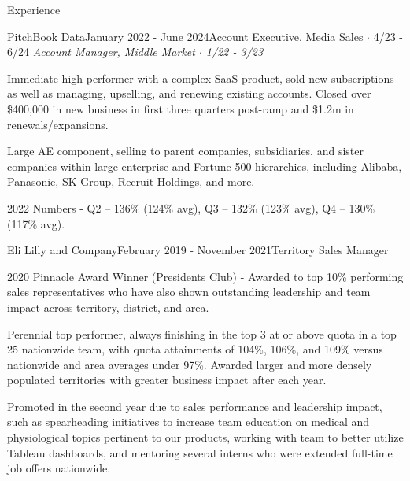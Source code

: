 \documentclass[
	11pt, %
]{resume} %
\begin{document}
\begin{rSection}{Experience}
\begin{rSubsection}{PitchBook Data}{January 2022 - June 2024\smallskip}{Account Executive, Media Sales $\cdot$ 4/23 - 6/24}{}
        \smallskip
        \smallskip
            \textit{Account Manager, Middle Market $\cdot$ 1/22 - 3/23}
        \smallskip
        \smallskip
		\item Immediate high performer with a complex SaaS product, sold new subscriptions as well as managing, upselling, and renewing existing accounts. Closed over \$400,000 in new business in first three quarters post-ramp and \$1.2m in renewals/expansions.
            \item Large AE component, selling to parent companies, subsidiaries, and sister companies within large enterprise and Fortune 500 hierarchies, including Alibaba, Panasonic, SK Group, Recruit Holdings, and more.
		\item 2022 Numbers - Q2 – 136\% (124\% avg), Q3 – 132\% (123\% avg), Q4 – 130\% (117\% avg).
            
	\end{rSubsection}


	\begin{rSubsection}{Eli Lilly and Company}{February 2019 - November 2021}{Territory Sales Manager}{}
		\item 2020 Pinnacle Award Winner (Presidents Club) - Awarded to top 10\% performing sales representatives who have also shown outstanding leadership and team impact across territory, district, and area.
		\item Perennial top performer, always finishing in the top 3 at or above quota in a top 25 nationwide team, with quota attainments of 104\%, 106\%, and 109\% versus \\nationwide and area averages under 97\%. Awarded larger and more densely populated territories with greater business impact after each year.

  
            \item Promoted in the second year due to sales performance and leadership impact, such as spearheading initiatives to increase team education on medical and physiological topics pertinent to our products, working with team to better utilize Tableau dashboards, and mentoring several interns who were extended full-time job offers nationwide.
            
	\end{rSubsection}


\end{rSection}
\end{document}
